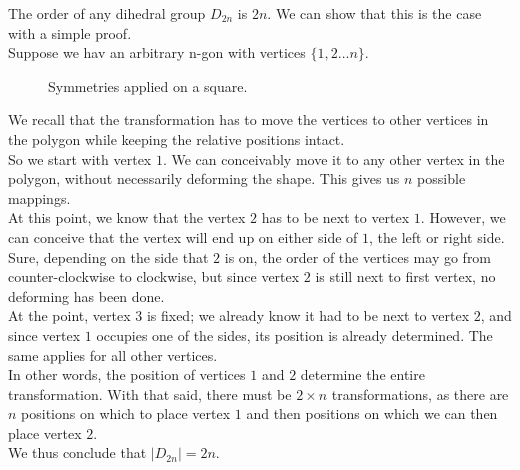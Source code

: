 \documentclass[12pt]{article}
\begin{document}
    The order of any dihedral group $D_{2n}$ is $2n$.
    We can show that this is the case with a simple proof. \\
    Suppose we hav an arbitrary n-gon with vertices $\{1, 2 \dots n\}$.
    \begin{figure}[H]
        \centering
        \caption{\label{fig:figure1} Symmetries applied on a square.}
    \end{figure}
    \noindent We recall that the transformation has to move
    the vertices to other vertices in the polygon while keeping
    the relative positions intact. \\
    So we start with vertex $1$.
    We can conceivably move it to any other vertex in the polygon,
    without necessarily deforming the shape. 
    This gives us $n$ possible mappings. \\
    At this point, we know that the vertex $2$
    has to be next to vertex $1$.
    However, we can conceive that the vertex will end up
    on either side of $1$,
    the left or right side. \\
    Sure, depending on the side that $2$ is on,
    the order of the vertices may go from counter-clockwise to clockwise,
    but since vertex $2$ is still next to first vertex,
    no deforming has been done. \\
    At the point, vertex $3$ is fixed;
    we already know it had to be next to vertex $2$,
    and since vertex $1$ occupies one of the sides,
    its position is already determined.
    The same applies for all other vertices. \\
    In other words, the position of vertices $1$ and $2$
    determine the entire transformation.
    With that said, there must be $2 \times n$ transformations,
    as there are $n$ positions on which to place vertex $1$
    and then positions on which we can then place vertex $2$. \\  
    We thus conclude that $|D_{2n}| = 2n$. \\
\end{document}
